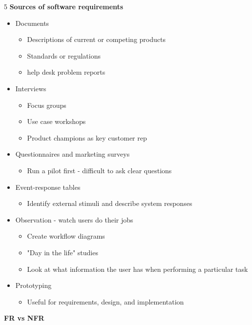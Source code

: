 \documentclass[landscape,a4paper]{extarticle}
\begin{document}
\begin{multicols*}{5}
    \textbf{Sources of software requirements}
    \begin{itemize}
        \item Documents
        \begin{itemize}
            \item Descriptions of current or competing products
            \item Standards or regulations
            \item help desk problem reports
        \end{itemize}
        \item Interviews
        \begin{itemize}
            \item Focus groups
            \item Use case workshops
            \item Product champions as key customer rep
        \end{itemize}
        \item Questionnaires and marketing surveys
        \begin{itemize}
            \item Run a pilot first - difficult to ask clear questions
        \end{itemize}
        \item Event-response tables
        \begin{itemize}
            \item Identify external stimuli and describe system responses
        \end{itemize}
        \item Observation - watch users do their jobs
        \begin{itemize}
            \item Create workflow diagrams
            \item "Day in the life" studies
            \item Look at what information the user has when performing a particular task
        \end{itemize}
        \item Prototyping
        \begin{itemize}
            \item Useful for requirements, design, and implementation
        \end{itemize}
    \end{itemize}
    \textbf{FR vs NFR}


\end{multicols*}
\end{document}
